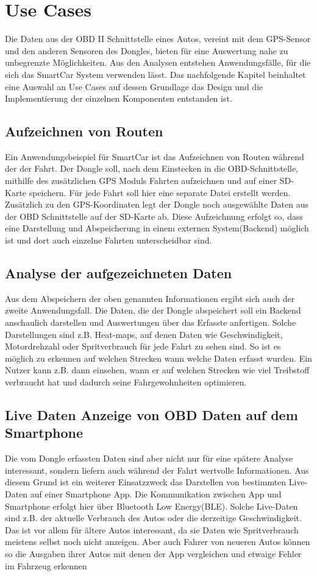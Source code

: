 \chapter{Use Cases}
\label{sec:useCases}
Die Daten aus der OBD II Schnittstelle eines Autos, vereint mit dem GPS-Sensor und den anderen Sensoren des Dongles, bieten für eine Auswertung nahe zu unbegrenzte Möglichkeiten. Aus den Analysen entstehen Anwendungsfälle, für die sich das SmartCar System verwenden lässt. Das nachfolgende Kapitel beinhaltet eine Auswahl an Use Cases auf dessen Grundlage das Design und die Implementierung der einzelnen Komponenten entstanden ist.
\section{Aufzeichnen von Routen}
Ein Anwendungsbeispiel für SmartCar ist das Aufzeichnen von Routen während der der Fahrt. Der Dongle soll, nach dem Einstecken in die OBD-Schnittstelle, mithilfe des zusätzlichen GPS Moduls Fahrten aufzeichnen und auf einer SD-Karte speichern. Für jede Fahrt soll hier eine separate Datei erstellt werden. Zusätzlich zu den GPS-Koordinaten legt der Dongle noch ausgewählte Daten aus der OBD Schnittstelle auf der SD-Karte ab. Diese Aufzeichnung erfolgt so, dass eine Darstellung und Abspeicherung in einem externen System(Backend) möglich ist und dort auch einzelne Fahrten unterscheidbar sind.
\section{Analyse der aufgezeichneten Daten}
Aus dem Abspeichern der oben genannten Informationen ergibt sich auch der zweite Anwendungsfall. Die Daten, die der Dongle abspeichert soll ein Backend anschaulich darstellen und Auswertungen über das Erfasste anfertigen. Solche Darstellungen sind z.B. Heat-maps, auf denen Daten wie Geschwindigkeit, Motordrehzahl oder Spritverbrauch für jede Fahrt zu sehen sind. So ist es möglich zu erkennen auf welchen Strecken wann welche Daten erfasst wurden. Ein Nutzer kann z.B. dann einsehen, wann er auf welchen Strecken wie viel Treibstoff verbraucht hat und dadurch seine Fahrgewohnheiten optimieren.
\section{Live Daten Anzeige von OBD Daten auf dem Smartphone}
Die vom Dongle erfassten Daten sind aber nicht nur für eine spätere Analyse interessant, sondern liefern auch während der Fahrt wertvolle Informationen. Aus diesem Grund ist ein weiterer Einsatzzweck das Darstellen von bestimmten Live-Daten auf einer Smartphone App. Die Kommunikation zwischen App und Smartphone erfolgt hier über Bluetooth Low Energy(BLE). Solche Live-Daten sind z.B. der aktuelle Verbrauch des Autos oder die derzeitige Geschwindigkeit. Das ist vor allem für ältere Autos interessant, da sie Daten wie Spritverbrauch meistens selbst noch nicht anzeigen. Aber auch Fahrer von neueren Autos können so die Ausgaben ihrer Autos mit denen der App vergleichen und etwaige Fehler im Fahrzeug erkennen
 